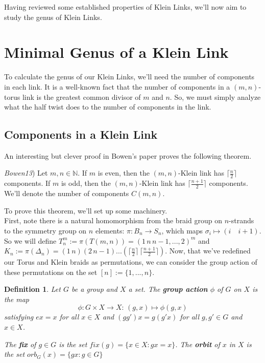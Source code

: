\documentclass[12pt]{article}
\newtheorem{definition}{Definition}[section]
\newenvironment{theorem}[2][Theorem]{\begin{trivlist}
\item[\hskip \labelsep {\bfseries #1}\hskip \labelsep {\bfseries #2.}]}{\end{trivlist}}
\begin{document}
Having reviewed some established properties of Klein Links, we'll now aim to study the genus of Klein Links.

\section{Minimal Genus of a Klein Link}

To calculate the genus of our Klein Links, we'll need the number of components in each link. It is a well-known fact that the number of components in a $(m, n)$-torus link is the greatest common divisor of $m$ and $n$. So, we must simply analyze what the half twist does to the number of components in the link.

\subsection{Components in a Klein Link}

An interesting but clever proof in Bowen's paper proves the following theorem.

\begin{theorem}{2.1} (\textit{Bowen13})
Let $m, n \in \mathds{N}$. If $m$ is even, then the $(m, n)$-Klein link has $\lceil \frac{n}{2} \rceil$  components. If $m$ is odd, then the $(m, n)$-Klein link has $\lceil \frac{n + 1}{2} \rceil$ components. We'll denote the number of components $C(m, n)$.
\end{theorem}

To prove this theorem, we'll set up some machinery. 
\\

First, note there is a natural homomorphism from the braid group on $n$-strands to the symmetry group on $n$ elements: $\pi:B_n \rightarrow S_n$, which maps $\sigma_i \mapsto (i \quad i+1)$. So we will define $T_n^m :=\pi(T(m, n)) = (1 \, n \, n-1 , ... , 2)^m$ and $K_n :=\pi(\Delta_n) = (1 \, n) (2 \, n-1) ... \left(\lceil\frac{n}{2}\rceil \, \lceil \frac{n+1}{2}\rceil \right)$.  Now, that we've redefined our Torus and Klein braids as permutations, we can consider the group action of these permutations on the set $[n] := \{1, ..., n\}$.

\begin{definition}
Let $G$ be a group and $X$ a set. The \textbf{group action} $\phi$ of $G$ on $X$ is the map $$\phi:G\times X \rightarrow X : \, (g, x) \mapsto \phi(g, x)$$ satisfying $ex = x$ for all $x \in X$ and $(gg')x = g(g'x)$ for all $g, g' \in G$ and $x\in X$.

The \textbf{fix} of $g \in G$ is the set $fix(g) = \{x \in X: gx = x \}$. The \textbf{orbit} of $x$ in $X$ is the set $orb_G(x) = \{gx : g \in G \}$
\end{definition}
\end{document}
